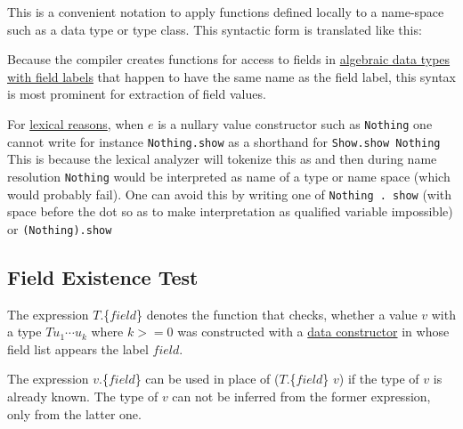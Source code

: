 This is a convenient notation to apply functions defined locally to a name-space such as a data type or type class. This syntactic form is translated like this:


Because the compiler creates functions for access to fields in \hyperref[fieldconstructor]{algebraic data types with field labels} that happen to have the same name as the field label, this syntax is most prominent for extraction of field values.

\label{confusedots}For \hyperref[qualified names]{lexical reasons}, when $e$ is a nullary value constructor such as \texttt{Nothing} one cannot write for instance \texttt{Nothing.show} as a shorthand for \texttt{Show.show Nothing}
This is because the lexical analyzer will tokenize this as 
and then during name resolution \texttt{Nothing} would be interpreted as name of a type or name space (which would probably fail).
One can avoid this by writing one of \texttt{Nothing . show} (with space before the dot so as to make interpretation as qualified variable impossible) or \texttt{(Nothing).show}

\subsection{Field Existence Test} \label{field existence}

The expression $T$.\{$field$\} denotes the function that checks, whether a value $v$ with a type $T u_1 \cdots u_k$  where $k>=0$ was constructed with a \hyperref[fieldconstructor]{data constructor} in whose field list appears the label $field$.

The expression $v$.\{$field$\} can be used in place of  ($T$.\{$field$\} $v$) if the type of $v$ is already known. The type of $v$ can not be inferred from the former expression, only from the latter one.

